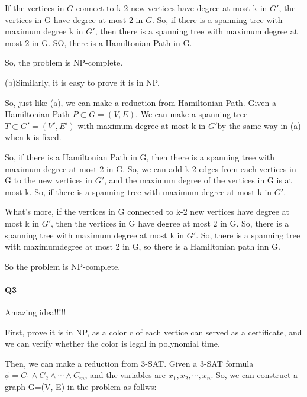 \documentclass[UTF8]{ctexart}
\renewcommand{\(}{\left(}
\renewcommand{\)}{\right)}
\begin{document}
If the vertices in $G$ connect to k-2 new vertices have degree at most k in $G'$, the vertices in G have degree at most 2 in $G$. So, if there is a spanning tree with maximum degree k in $G'$, then there is a spanning tree with maximum degree at most 2 in G.  
SO, there is a Hamiltonian Path in G.

So, the problem is NP-complete.

(b)Similarly, it is easy to prove it is in NP. 

So, just like (a), we can make a reduction from Hamiltonian Path. Given a Hamiltonian Path $P \subset G= (V, E)$. We can make a spanning tree $T \subset G' = (V', E')$ with maximum degree at most k in $G'$by the same way in (a) when k is fixed.

So, if there is a Hamiltonian Path in G, then there is a spanning tree with maximum degree at most 2 in G. 
So, we can add k-2 edges from each vertices in G to the new vertices in $G'$, and the maximum degree of the vertices in G is at most k. So, if there is a spanning tree with maximum degree at most k in $G'$.

What's more, if the vertices in G connected to k-2 new vertices have degree at most k in $G'$, then the vertices in G have degree at most 2 in G. So, there is a 
spanning tree with maximum degree at most k in $G'$. So, there is a spanning tree with maximumdegree at most 2 in G, so there is a Hamiltonian path inn G.

So the problem is NP-complete.


\paragraph{Q3}
Amazing idea!!!!!

First, prove it is in NP, as a color c of each vertice can served as a certificate, and we can verify whether the color is legal in polynomial time.

Then, we can make a reduction from 3-SAT. Given a 3-SAT formula $\phi = C_{1} \wedge C_{2} \wedge \cdots \wedge C_{m}$, and the variables are $x_{1}, x_{2}, \cdots, x_{n}$. So, we can construct a graph
G=(V, E) in the problem as follws:
\end{document}
